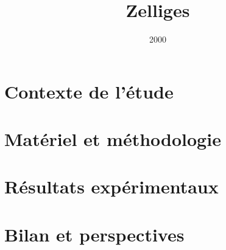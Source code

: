 \documentclass[%
  dvipsnames, %
  svgnames, %
  a4paper, %
  twoside, %
  openany, %
  10pt, %
  oldfontcommands %
]{nefermemoir}
\title{Zelliges}
\author{\SL}
\date{2000}
\begin{document}
\thispagestyle{empty}
\maketitle

\CaptionPetit

\frontmatter
\tableofcontents*



\mainmatter
\part{Contexte de l'étude}


\part{Matériel et méthodologie}


\part{Résultats expérimentaux}






\part{Bilan et perspectives}


\appendix


\backmatter
\newpage
\listoffigures
\listoftables

\nocite{*}
\printbibliography[heading=memoir,title=Bibliographie]

\cleardoublepage
\pagestyle{empty}
~\newpage


\end{document}
